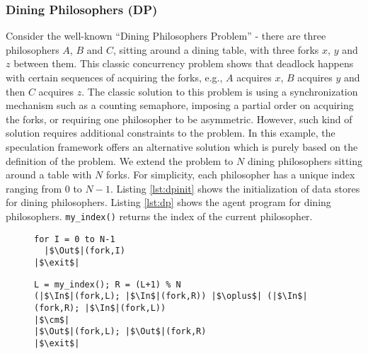 \subsubsection*{Dining Philosophers (DP)}



Consider the well-known ``Dining Philosophers Problem''
\cite{Dijkstra2002:Hierarchical} - there are three
philosophers $A$, $B$ and $C$, sitting around a dining table,
with three forks $x$, $y$ and $z$ between them.
This classic concurrency problem
shows that deadlock happens with certain sequences of acquiring the forks,
e.g., $A$ acquires $x$, $B$ acquires $y$ and then
$C$ acquires $z$. 
The classic solution to this problem is using a synchronization mechanism 
such as a counting semaphore, imposing a partial order on acquiring the forks, 
or requiring one philosopher to be asymmetric.
However, such kind of solution requires additional constraints to the problem. 
%
In this example, the speculation framework offers an alternative
solution which is purely based on the definition of the problem.
We extend the problem to $N$ dining philosophers 
sitting around a table with $N$ forks.
For simplicity, each philosopher has a unique index ranging from $0$ to $N-1$. 
Listing \ref{lst:dpinit} shows the initialization of data stores 
for dining philosophers.
Listing \ref{lst:dp} shows the agent program for dining philosophers.
\texttt{my\_index()} returns the index of the current philosopher.

\begin{figure}[tb]
\begin{lstlisting}[label=lst:dpinit,caption=Dining Philosophers (initialization)]
for I = 0 to N-1
  |$\Out$|(fork,I)
|$\exit$|
\end{lstlisting}
\begin{lstlisting}[label=lst:dp,caption={Dining Philosophers. \texttt{\%} denotes the modulo operation. {\tt ;} separates multiple statements in one line. $\Out$ is non-blocking in the tuple space data model, so we don't need choices for putting back forks.}]
L = my_index(); R = (L+1) % N
(|$\In$|(fork,L); |$\In$|(fork,R)) |$\oplus$| (|$\In$|(fork,R); |$\In$|(fork,L))
|$\cm$|
|$\Out$|(fork,L); |$\Out$|(fork,R)
|$\exit$|
\end{lstlisting}
\shrink
\shrink
\end{figure}

